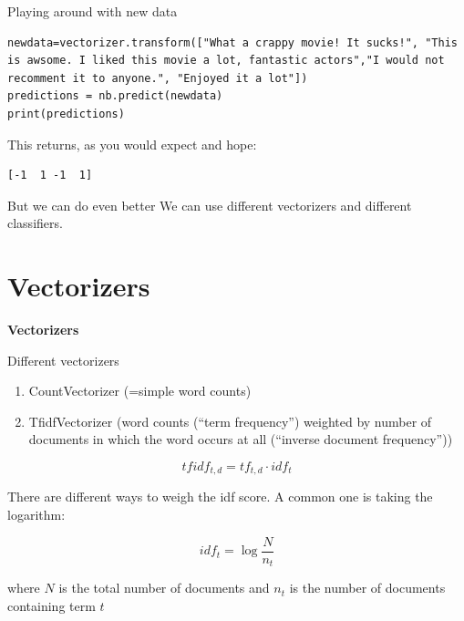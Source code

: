 \documentclass{beamer}
\begin{document}
\begin{frame}[fragile]{Playing around with new data}
\begin{lstlisting}
newdata=vectorizer.transform(["What a crappy movie! It sucks!", "This is awsome. I liked this movie a lot, fantastic actors","I would not recomment it to anyone.", "Enjoyed it a lot"])
predictions = nb.predict(newdata)
print(predictions)
\end{lstlisting}
This returns, as you would expect and hope:
\begin{lstlisting} 
[-1  1 -1  1]
\end{lstlisting}


\end{frame}




\begin{frame}{But we can do even better}
We can use different vectorizers and different classifiers.
\end{frame}



\section{Vectorizers}

\begin{frame}[plain]
\textbf{Vectorizers}
\end{frame}

\begin{frame}{Different vectorizers}
\begin{enumerate}[<+->]
\item CountVectorizer (=simple word counts)
\item TfidfVectorizer (word counts (``term frequency'') weighted by number of documents in which the word occurs at all (``inverse document frequency''))
\end{enumerate}

\pause
$$tfidf_{t,d} = tf_{t,d} \cdot idf_{t}$$

There are different ways to weigh the idf score. A common one is taking the logarithm:

$$idf_{t} = \log \frac{N}{n_t}$$

where $N$ is the total number of documents and $n_t$ is the number of documents containing term $t$
\end{frame}
\end{document}
